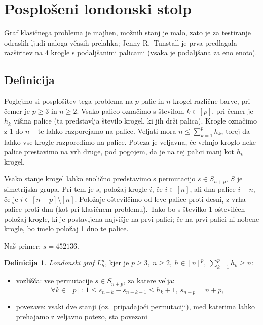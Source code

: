 \documentclass[11pt,a4paper]{article}
\theoremstyle{definition} %
\newtheorem{definicija}{Definicija}[section]
\theoremstyle{plain} %
\begin{document}
\section{Posplošeni londonski stolp}
Graf klasičnega problema je majhen, možnih stanj je malo, zato je za testiranje odraslih ljudi naloga včasih prelahka; Jenny R.\ Tunstall je prva predlagala razširitev na 4 krogle s podaljšanimi palicami (vsaka je podaljšana za eno enoto).

\subsection{Definicija}

Poglejmo si posplošitev tega problema na $p$ palic in $n$ krogel različne barve, pri čemer je $p \geq 3 \text{ in } n \geq 2$. Vsako palico označimo s številom $k \in [p]$, pri čemer je $h_k$ višina palice (ta predstavlja število krogel, ki jih drži palica). Krogle označimo z 1 do $n$ -- te lahko razporejamo na palice. Veljati mora $n \leq \sum_{k=1}^p h_k$, torej da lahko vse krogle razporedimo na palice. 
Poteza je veljavna, če vrhnjo kroglo neke palice prestavimo na vrh druge, pod pogojem, da je na tej palici manj kot $h_k$ krogel.

Vsako stanje krogel lahko enolično predstavimo s permutacijo $s \in S_{n+p}$, $S$ je simetrijska grupa. Pri tem je $s_i$ položaj krogle $i$, če $i \in [n] $, ali dna palice $i-n$, če je $i \in [n+p] \setminus [n] $. Položaje oštevilčimo od leve palice proti desni, z vrha palice proti dnu (kot pri klasičnem problemu). Tako bo s številko 1 oštevilčen položaj krogle, ki je postavljena najvišje na prvi palici; če na prvi palici ni nobene krogle, bo imelo položaj 1 dno te palice.

Naš primer: $s = 452136$.

\begin{definicija}
    \emph{Londonski graf} $L_h^n$, kjer je $p \geq 3,\ n \geq 2,\ h \in [n]^p,\  \sum_{k=1}^p h_k \geq n$:
    \begin{itemize}
        \item vozlišča: vse permutacije $s \in S_{n+p}$, za katere velja:
        \[\forall k \in [p]:\ 1 \leq s_{n+k} - s_{n+k-1} \leq h_k + 1,\ s_{n+p} = n + p ,\]
        \item povezave: vsaki dve stanji (oz.\ pripadajoči permutaciji), med katerima lahko prehajamo z veljavno potezo, sta povezani
    \end{itemize}
\end{definicija}
\end{document}
